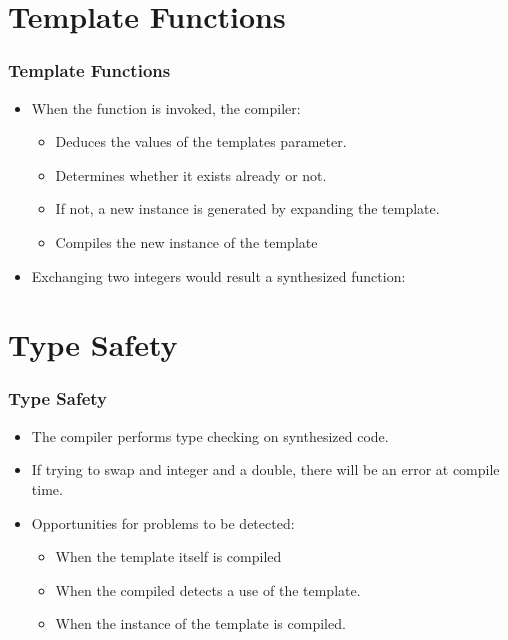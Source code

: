 \documentclass{beamer}
\begin{document}
\section{Template Functions}
\begin{frame}
\frametitle{Template Functions}
\begin{itemize}
\item When the function is invoked, the compiler:
\begin{itemize}
\item Deduces the values of the templates parameter.
\item Determines whether it exists already or not.
\item If not, a new instance is generated by expanding the template.
\item Compiles the new instance of the template
\end{itemize}
\temp
\item Exchanging two integers would result a synthesized function:
\syn
\end{itemize}
\end{frame}
\section{Type Safety}
\begin{frame}
\frametitle{Type Safety}
\begin{itemize}
\item The compiler performs type checking on synthesized code.
\item If trying to swap and integer and a double, there will be an error at compile time.
\item Opportunities for problems to be detected:
\begin{itemize}
\item When the template itself is compiled
\item When the compiled detects a use of the template.
\item When the instance of the template is compiled.
\end{itemize}
\end{itemize}
\end{frame}
\end{document}
